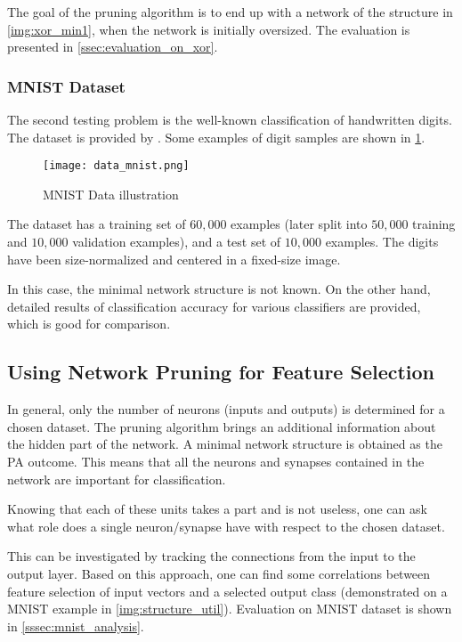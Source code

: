 The goal of the pruning algorithm is to end up with a network of the structure in \cref{img:xor_min1}, when the network is initially oversized. The evaluation is presented in \cref{ssec:evaluation_on_xor}.

\subsubsection*{MNIST Dataset}
The second testing problem is the well-known classification of handwritten digits. The dataset is provided by \citep{online:mnist}. Some examples of digit samples are shown in \cref{img:data_mnist}.

\begin{figure}[H]
  \centering
  \texttt{[image: data\_mnist.png]}
  \caption{MNIST Data illustration \citep{online:mnist}}
  \label{img:data_mnist}
\end{figure}

The dataset has a training set of $ 60,000 $ examples (later split into $ 50,000 $ training and $ 10,000 $ validation examples), and a test set of $ 10,000 $ examples. The digits have been size-normalized and centered in a fixed-size image.

In this case, the minimal network structure is not known. On the other hand, detailed results of classification accuracy for various classifiers are provided, which is good for comparison.

\subsection{Using Network Pruning for Feature Selection} \label{ssec:minimal_structure_util}
In general, only the number of neurons (inputs and outputs) is determined for a chosen dataset. The pruning algorithm brings an additional information about the hidden part of the network. A minimal network structure is obtained as the PA outcome. This means that all the neurons and synapses contained in the network are important for classification.

Knowing that each of these units takes a part and is not useless, one can ask what role does a single neuron/synapse have with respect to the chosen dataset.

This can be investigated by tracking the connections from the input to the output layer. Based on this approach, one can find some correlations between feature selection of input vectors and a selected output class (demonstrated on a MNIST example in \cref{img:structure_util}). Evaluation on MNIST dataset is shown in \cref{sssec:mnist_analysis}.

